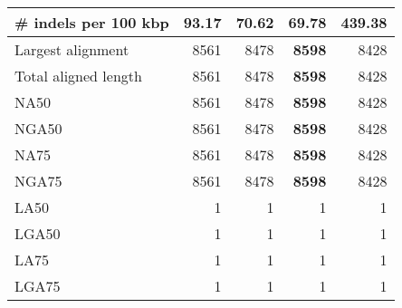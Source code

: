 \documentclass[12pt,a4paper]{article}
\begin{document}
\begin{table}[ht]
\begin{center}
\begin{tabular}{|l*{4}{|r}|}
\# indels per 100 kbp & 93.17 & 70.62 & {\bf 69.78} & 439.38 \\ \hline
Largest alignment & 8561 & 8478 & {\bf 8598} & 8428 \\ \hline
Total aligned length & 8561 & 8478 & {\bf 8598} & 8428 \\ \hline
NA50 & 8561 & 8478 & {\bf 8598} & 8428 \\ \hline
NGA50 & 8561 & 8478 & {\bf 8598} & 8428 \\ \hline
NA75 & 8561 & 8478 & {\bf 8598} & 8428 \\ \hline
NGA75 & 8561 & 8478 & {\bf 8598} & 8428 \\ \hline
LA50 & 1 & 1 & 1 & 1 \\ \hline
LGA50 & 1 & 1 & 1 & 1 \\ \hline
LA75 & 1 & 1 & 1 & 1 \\ \hline
LGA75 & 1 & 1 & 1 & 1 \\ \hline
\end{tabular}
\end{center}
\end{table}
\end{document}
